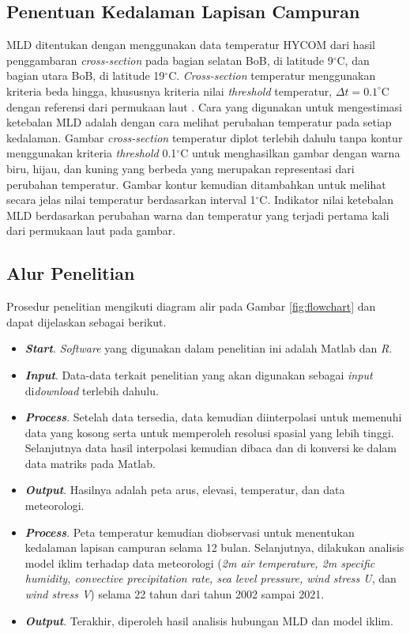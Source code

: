 \subsection[Penentuan Kedalaman Lapisan Campuran]{Penentuan Kedalaman Lapisan Campuran}
\begin{spacing}{1.5}
	MLD ditentukan dengan menggunakan data temperatur HYCOM dari hasil penggambaran \textit{cross-section} pada bagian selatan BoB, di latitude 9$^\circ$C, dan bagian utara BoB, di latitude 19$^\circ$C. \textit{Cross-section} temperatur menggunakan kriteria beda hingga, khususnya kriteria nilai \textit{threshold} temperatur, $\Delta t=0.1^\circ$C dengan referensi dari permukaan laut . Cara yang digunakan untuk mengestimasi ketebalan MLD adalah dengan cara melihat perubahan temperatur pada setiap kedalaman. Gambar \textit{cross-section} temperatur diplot terlebih dahulu tanpa kontur menggunakan kriteria \textit{threshold} 0.1$^\circ$C untuk menghasilkan gambar dengan warna biru, hijau, dan kuning yang berbeda yang merupakan representasi dari perubahan temperatur. Gambar kontur kemudian ditambahkan untuk melihat secara jelas nilai temperatur berdasarkan interval 1$^\circ$C. Indikator nilai ketebalan MLD berdasarkan perubahan warna dan temperatur yang terjadi pertama kali dari permukaan laut pada gambar.
	
	
	\subsection[Alur Penelitian]{Alur Penelitian}
	Prosedur penelitian mengikuti diagram alir pada Gambar \ref{fig:flowchart} dan dapat dijelaskan sebagai berikut. 
	\begin{itemize}
		\item \textbf{\textit{Start}}. \textit{Software} yang digunakan dalam penelitian ini adalah Matlab dan \textit{R}.
		\item \textbf{\textit{Input}}. Data-data terkait penelitian yang akan digunakan sebagai \textit{input} di\textit{download} terlebih dahulu.
		\item \textbf{\textit{Process}}. Setelah data tersedia, data kemudian diinterpolasi untuk memenuhi data yang kosong serta untuk memperoleh resolusi spasial yang lebih tinggi. Selanjutnya data hasil interpolasi kemudian dibaca dan di konversi ke dalam data matriks pada Matlab. 
		\item \textbf{\textit{Output}}. Hasilnya adalah peta arus, elevasi, temperatur, dan data meteorologi. 
		\item \textbf{\textit{Process}}. Peta temperatur kemudian diobservasi untuk menentukan kedalaman lapisan campuran selama 12 bulan. Selanjutnya, dilakukan analisis model iklim terhadap data meteorologi (\textit{2m air temperature, 2m specific humidity, convective precipitation rate, sea level pressure, wind stress U}, dan \textit{wind stress V}) selama 22 tahun dari tahun 2002 sampai 2021. 
		\item \textbf{\textit{Output}}. Terakhir, diperoleh hasil analisis hubungan MLD dan model iklim.
	\end{itemize}
\end{spacing}
